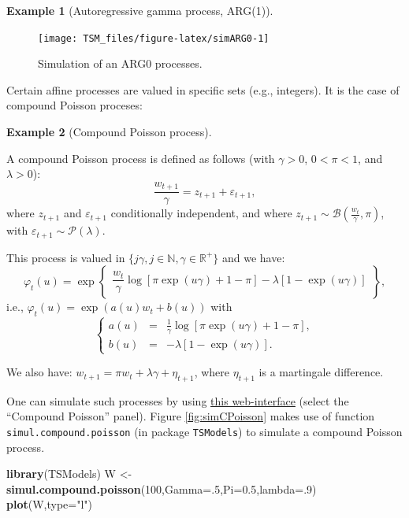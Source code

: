 \documentclass[
  12pt,
]{book}
\newenvironment{Shaded}{\begin{snugshade}}{\end{snugshade}}
\newcommand{\AttributeTok}[1]{\textcolor[rgb]{0.13,0.29,0.53}{#1}}
\newcommand{\DecValTok}[1]{\textcolor[rgb]{0.00,0.00,0.81}{#1}}
\newcommand{\FloatTok}[1]{\textcolor[rgb]{0.00,0.00,0.81}{#1}}
\newcommand{\FunctionTok}[1]{\textcolor[rgb]{0.13,0.29,0.53}{\textbf{#1}}}
\newcommand{\NormalTok}[1]{#1}
\newcommand{\OtherTok}[1]{\textcolor[rgb]{0.56,0.35,0.01}{#1}}
\newcommand{\StringTok}[1]{\textcolor[rgb]{0.31,0.60,0.02}{#1}}
\theoremstyle{definition}
\theoremstyle{definition}
\newtheorem{example}{Example}[chapter]
\theoremstyle{definition}
\theoremstyle{definition}
\theoremstyle{remark}
\begin{document}
\begin{example}[Autoregressive gamma process, ARG(1)]
\begin{figure}
\texttt{[image: TSM\_files/figure-latex/simARG0-1]} \caption{Simulation of an ARG0 processes.}\label{fig:simARG0}
\end{figure}

\end{example}

Certain affine processes are valued in specific sets (e.g., integers). It is the case of compound Poisson proceses:

\begin{example}[Compound Poisson process]
\protect\hypertarget{exm:CompoundPoisson}{}\label{exm:CompoundPoisson}

A compound Poisson process is defined as follows (with \(\gamma > 0\), \(0 < \pi< 1\), and \(\lambda > 0\)):
\[\frac{w_{t+1}}{\gamma} = z_{t+1} + \varepsilon_{t+1},
\]
where \(z_{t+1}\) and \(\varepsilon_{t+1}\) conditionally independent, and where
\(z_{t+1} \sim {\mathcal B} \left(\frac{w_t}{\gamma},\pi\right)\), with \(\varepsilon_{t+1} \sim {\mathcal P}(\lambda)\).

This process is valued in \(\{j \gamma, j \in \mathbb{N}, \gamma \in \mathbb{R}^+\}\) and we have:
\[
\varphi_t(u) = \exp\left\{
\begin{array}{l}
\dfrac{w_t}{\gamma}   \log[\pi
\exp(u\gamma)+1-\pi]-\lambda[1-\exp(u \gamma)]
\end{array}
\right\},
\]
i.e., \(\varphi_t(u) = \exp\left(a(u)w_t+b(u)\right)\) with
\[
\left\{
\begin{array}{ccl}
a(u)&=& \frac{1}{\gamma}   \log[\pi   \exp(u
\gamma)+1-\pi],\\
b(u) &=& -\lambda[1-\exp(u \gamma)].
\end{array}
\right.
\]

We also have: \(w_{t+1} = \pi w_t + \lambda \gamma + \eta_{t+1}\), where \(\eta_{t+1}\) is a
martingale difference.

One can simulate such processes by using \href{https://jrenne.shinyapps.io/Affine/}{this web-interface} (select the ``Compound Poisson'' panel). Figure \ref{fig:simCPoisson} makes use of function \texttt{simul.compound.poisson} (in package \texttt{TSModels}) to simulate a compound Poisson process.

\begin{Shaded}
\begin{Highlighting}[]
\FunctionTok{library}\NormalTok{(TSModels)}
\NormalTok{W }\OtherTok{\textless{}{-}} \FunctionTok{simul.compound.poisson}\NormalTok{(}\DecValTok{100}\NormalTok{,}\AttributeTok{Gamma=}\NormalTok{.}\DecValTok{5}\NormalTok{,}\AttributeTok{Pi=}\FloatTok{0.5}\NormalTok{,}\AttributeTok{lambda=}\NormalTok{.}\DecValTok{9}\NormalTok{)}
\FunctionTok{plot}\NormalTok{(W,}\AttributeTok{type=}\StringTok{"l"}\NormalTok{)}
\end{Highlighting}
\end{Shaded}


\end{example}
\end{document}

